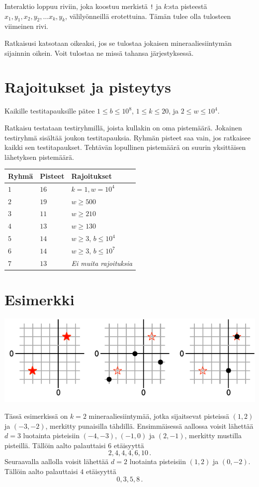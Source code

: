 Interaktio loppuu riviin, joka koostuu merkistä \texttt{!} ja $k$:sta pisteestä $x_1, y_1, x_2, y_2, \ldots x_k, y_k$, välilyönneillä erotettuina.
Tämän tulee olla tulosteen viimeinen rivi.

Ratkaisusi katsotaan oikeaksi, jos se tulostaa jokaisen mineraaliesiintymän sijainnin oikein.
Voit tulostaa ne missä tahansa järjestyksessä.

\section*{Rajoitukset ja pisteytys}

Kaikille testitapauksille pätee
$1\leq b \leq 10^8$, %
$1 \leq k \leq 20$, %
ja
$2 \le w \le 10^4$. %

Ratkaisu testataan testiryhmillä, joista kullakin on oma pistemäärä.
Jokainen testiryhmä sisältää joukon testitapauksia.
Ryhmän pisteet saa vain, jos ratkaisee kaikki sen testitapaukset.
Tehtävän lopullinen pistemäärä on suurin yksittäisen lähetyksen pistemäärä.

\medskip
\begin{tabular}{lll}
Ryhmä & Pisteet & Rajoitukset \\\hline
  $1$ & $16$ & $k = 1, w = 10^4$\\
  $2$ & $19$ & $w \ge 500$\\
  $3$ & $11$ & $w \ge 210$\\
  $4$ & $13$ & $w \ge 130$\\
  $5$ & $14$ & $w \ge 3$, $b \le 10^4$\\
  $6$ & $14$ & $w \ge 3$, $b \le 10^7$\\
  $7$ & $13$ & \emph{Ei muita rajoituksia}
\end{tabular}

\section*{Esimerkki}

\includegraphics[width=.6\textwidth]{img/sample1.pdf}

Tässä esimerkissä on $k=2$ mineraaliesiintymää, jotka sijaitsevat pisteissä $(1,2)$ ja $(-3,-2)$, merkitty punaisilla tähdillä.
Ensimmäisessä aallossa voisit lähettää $d=3$ luotainta pisteisiin $(-4,-3)$, $(-1, 0)$ ja $(2,-1)$, merkitty mustilla pisteillä.
Tällöin aalto palauttaisi $6$ etäisyyttä \[
  2, 4, 4, 4, 6, 10\,.
\]
Seuraavalla aallolla voisit lähettää $d=2$ luotainta pisteisiin $(1,2)$ ja $(0,-2)$.
Tällöin aalto palauttaisi $4$ etäisyyttä \[
  0, 3, 5, 8\,.
\]
